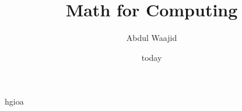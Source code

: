 \documentclass[]{article}
\title{Math for Computing}
\author{Abdul Waajid}
\date{today}
\begin{document}
 hgioa
\end{document}
